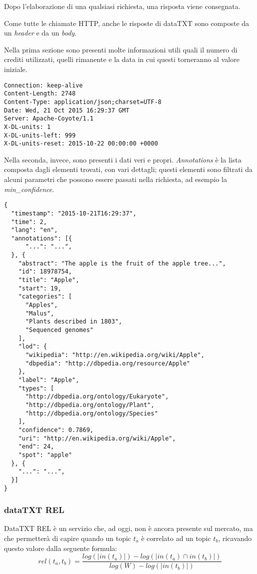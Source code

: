 		Dopo l'elaborazione di una qualsiasi richiesta, una risposta viene consegnata.

		Come  tutte le chiamate HTTP, anche le risposte di dataTXT sono composte da un \emph{header} e da un \emph{body}.

		Nella prima sezione sono presenti molte informazioni utili quali il numero di crediti utilizzati, quelli rimanente e la data in cui questi torneranno al valore iniziale.
		
		\begin{lstlisting}
Connection: keep-alive
Content-Length: 2748
Content-Type: application/json;charset=UTF-8
Date: Wed, 21 Oct 2015 16:29:37 GMT
Server: Apache-Coyote/1.1
X-DL-units: 1
X-DL-units-left: 999
X-DL-units-reset: 2015-10-22 00:00:00 +0000
		\end{lstlisting}

		Nella seconda, invece, sono presenti i dati veri e propri. \emph{Annotations} è la lista composta dagli elementi trovati, con vari dettagli; questi elementi sono filtrati da alcuni parametri che possono essere passati nella richiesta,  ad esempio la \emph{min\_confidence}.

		\begin{lstlisting}
{
  "timestamp": "2015-10-21T16:29:37",
  "time": 2,
  "lang": "en",
  "annotations": [{
      "...": "...",
  }, {
    "abstract": "The apple is the fruit of the apple tree...",
    "id": 18978754,
    "title": "Apple",
    "start": 19,
    "categories": [
      "Apples",
      "Malus",
      "Plants described in 1803",
      "Sequenced genomes"
    ],
    "lod": {
      "wikipedia": "http://en.wikipedia.org/wiki/Apple",
      "dbpedia": "http://dbpedia.org/resource/Apple"
    },
    "label": "Apple",
    "types": [
      "http://dbpedia.org/ontology/Eukaryote",
      "http://dbpedia.org/ontology/Plant",
      "http://dbpedia.org/ontology/Species"
    ],
    "confidence": 0.7869,
    "uri": "http://en.wikipedia.org/wiki/Apple",
    "end": 24,
    "spot": "apple"
  }, {
    "...": "...",
  }]
}
		\end{lstlisting}

	\subsubsection{dataTXT REL}
		DataTXT REL  è un servizio che, ad oggi, non è ancora presente sul mercato, ma che permetterà di capire quando un topic $t_a$ è correlato ad un topic $t_b$, ricavando questo valore dalla seguente formula:
		\begin{equation*}
			rel(t_a, t_b) = \frac{log(| in(t_a) |) - log(| in(t_a) \cap in(t_b)|)}{log(W) - log(|in(t_b)|)}
		\end{equation*}

